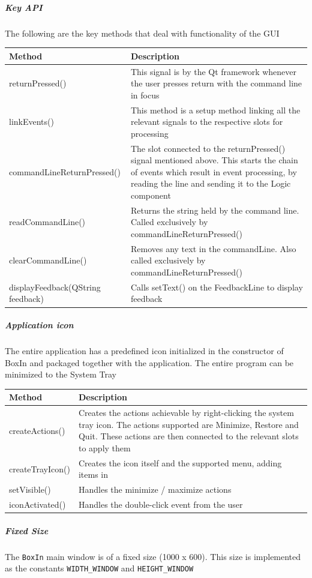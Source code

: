\documentclass[12pt]{extarticle}
\begin{document}
\subparagraph{Key API}
The following are the key methods that deal with functionality of the GUI\\
\begin{tabular}{p{6cm} p{12cm}}
Method & Description\\
\hline
returnPressed() & This signal is by the Qt framework whenever the user presses return with the command line in focus\\
linkEvents() & This method is a setup method linking all the relevant signals to the respective slots for processing\\
commandLineReturnPressed() & The slot connected to the returnPressed() signal mentioned above. This starts the chain of events which result in event processing, by reading the line and sending it to the Logic component\\
readCommandLine() & Returns the string held by the command line. Called exclusively by commandLineReturnPressed()\\
clearCommandLine() & Removes any text in the commandLine. Also called exclusively by commandLineReturnPressed()\\
displayFeedback(QString feedback) & Calls setText() on the FeedbackLine to display feedback\\
\end{tabular}

\subparagraph{Application icon}
The entire application has a predefined icon initialized in the constructor of BoxIn and packaged together with the application. The entire program can be minimized to the System Tray\\
\begin{tabular}{p{6cm} p{12cm}}
Method & Description\\
\hline
createActions() & Creates the actions achievable by right-clicking the system tray icon. The actions supported are Minimize, Restore and Quit. These actions are then connected to the relevant slots to apply them\\
createTrayIcon() & Creates the icon itself and the supported menu, adding items in\\
setVisible() & Handles the minimize / maximize actions\\
iconActivated() & Handles the double-click event from the user
\end{tabular}

\subparagraph{Fixed Size}
The \texttt{BoxIn} main window is of a fixed size (1000 x 600). This size is implemented as the constants \texttt{WIDTH\_WINDOW} and \texttt{HEIGHT\_WINDOW}
\end{document}
